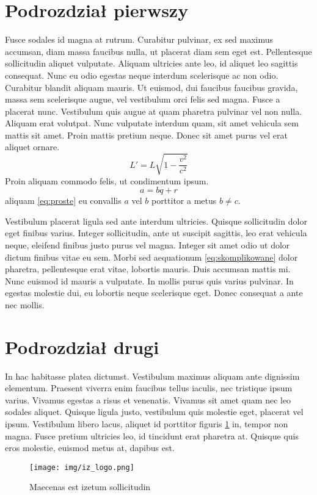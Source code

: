 \documentclass[polish,engineering]{wizthesis}
\begin{document}
\section{Podrozdział pierwszy}

Fusce sodales id magna at rutrum. Curabitur pulvinar, ex sed maximus accumsan, diam massa faucibus nulla, ut placerat diam sem eget est. Pellentesque sollicitudin aliquet vulputate. Aliquam ultricies ante leo, id aliquet leo sagittis consequat. Nunc eu odio egestas neque interdum scelerisque ac non odio. Curabitur blandit aliquam mauris.
Ut euismod, dui faucibus faucibus gravida, massa sem scelerisque augue, vel vestibulum orci felis sed magna. Fusce a placerat nunc. Vestibulum quis augue at quam pharetra pulvinar vel non nulla. Aliquam erat volutpat. Nunc vulputate interdum quam, sit amet vehicula sem mattis sit amet. Proin mattis pretium neque. Donec sit amet purus vel erat aliquet \cite{einstein} ornare.
\begin{equation} \label{eq:skomplikowane}
  L' = {L}{\sqrt{1-\frac{v^2}{c^2}}}
\end{equation}
Proin aliquam commodo felis, ut condimentum ipsum.
\begin{equation} \label{eq:proste}
  a = bq + r
\end{equation}
aliquam \eqref{eq:proste} eu convallis $a$ vel $b$ porttitor a metus $b \neq c$.

Vestibulum placerat ligula sed ante interdum ultricies. Quisque sollicitudin dolor eget finibus varius. Integer sollicitudin, ante ut suscipit sagittis, leo erat vehicula neque, eleifend finibus justo purus vel magna. Integer sit amet odio ut dolor dictum finibus vitae eu sem. Morbi sed aequationum \eqref{eq:skomplikowane} dolor pharetra, pellentesque erat vitae, lobortis mauris. Duis accumsan mattis mi. Nunc euismod id mauris a vulputate. In mollis purus quis varius pulvinar. In egestas molestie dui, eu lobortis neque scelerisque eget. Donec consequat a ante nec mollis.

\section{Podrozdział drugi}

In hac habitasse platea dictumst. Vestibulum maximus aliquam ante dignissim elementum. Praesent viverra enim faucibus tellus iaculis, nec tristique ipsum varius. Vivamus egestas a risus et venenatis. Vivamus sit amet quam nec leo sodales aliquet. Quisque ligula justo, vestibulum quis molestie eget, placerat vel ipsum. Vestibulum libero lacus, aliquet id porttitor figuris \ref{fig:iz} in, tempor non magna. Fusce pretium ultricies leo, id tincidunt erat pharetra at. Quisque quis eros molestie, euismod metus at, dapibus est.
\begin{figure}[ht]
  \centering
  \texttt{[image: img/iz\_logo.png]}
  \caption{Maecenas est izetum sollicitudin}
  \label{fig:iz}
\end{figure}
\end{document}
